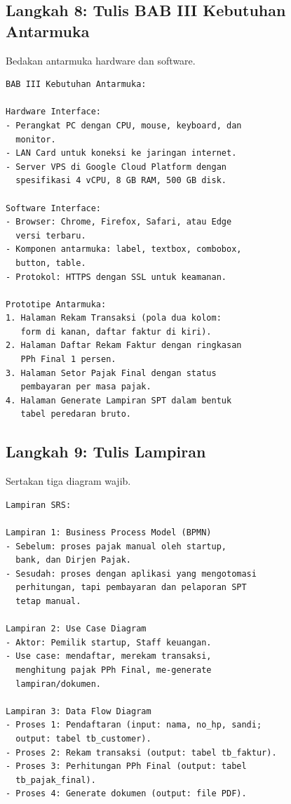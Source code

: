 \documentclass[11pt,a4paper]{article}
\begin{document}
\subsection{Langkah 8: Tulis BAB III Kebutuhan Antarmuka}

Bedakan antarmuka hardware dan software.

\begin{lstlisting}[style=out]
BAB III Kebutuhan Antarmuka:

Hardware Interface:
- Perangkat PC dengan CPU, mouse, keyboard, dan
  monitor.
- LAN Card untuk koneksi ke jaringan internet.
- Server VPS di Google Cloud Platform dengan
  spesifikasi 4 vCPU, 8 GB RAM, 500 GB disk.

Software Interface:
- Browser: Chrome, Firefox, Safari, atau Edge
  versi terbaru.
- Komponen antarmuka: label, textbox, combobox,
  button, table.
- Protokol: HTTPS dengan SSL untuk keamanan.

Prototipe Antarmuka:
1. Halaman Rekam Transaksi (pola dua kolom:
   form di kanan, daftar faktur di kiri).
2. Halaman Daftar Rekam Faktur dengan ringkasan
   PPh Final 1 persen.
3. Halaman Setor Pajak Final dengan status
   pembayaran per masa pajak.
4. Halaman Generate Lampiran SPT dalam bentuk
   tabel peredaran bruto.
\end{lstlisting}

\subsection{Langkah 9: Tulis Lampiran}

Sertakan tiga diagram wajib.

\begin{lstlisting}[style=out]
Lampiran SRS:

Lampiran 1: Business Process Model (BPMN)
- Sebelum: proses pajak manual oleh startup,
  bank, dan Dirjen Pajak.
- Sesudah: proses dengan aplikasi yang mengotomasi
  perhitungan, tapi pembayaran dan pelaporan SPT
  tetap manual.

Lampiran 2: Use Case Diagram
- Aktor: Pemilik startup, Staff keuangan.
- Use case: mendaftar, merekam transaksi,
  menghitung pajak PPh Final, me-generate
  lampiran/dokumen.

Lampiran 3: Data Flow Diagram
- Proses 1: Pendaftaran (input: nama, no_hp, sandi;
  output: tabel tb_customer).
- Proses 2: Rekam transaksi (output: tabel tb_faktur).
- Proses 3: Perhitungan PPh Final (output: tabel
  tb_pajak_final).
- Proses 4: Generate dokumen (output: file PDF).
\end{lstlisting}
\end{document}
